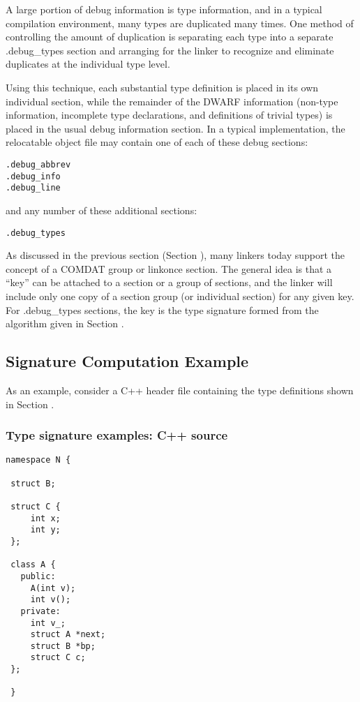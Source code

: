 A large portion of debug information is type information, and
in a typical compilation environment, many types are duplicated
many times. One method of controlling the amount of duplication
is separating each type into a separate .debug\_types section
and arranging for the linker to recognize and eliminate
duplicates at the individual type level.

Using this technique, each substantial type definition is
placed in its own individual section, while the remainder
of the DWARF information (non-type information, incomplete
type declarations, and definitions of trivial types) is
placed in the usual debug information section. In a typical
implementation, the relocatable object file may contain one
of each of these debug sections:

\begin{alltt}
.debug\_abbrev
.debug\_info
.debug\_line
\end{alltt}

and any number of these additional sections:

\begin{alltt}
.debug\_types
\end{alltt}

As discussed in the previous section 
(Section ), 
many
linkers today support the concept of a COMDAT group or
linkonce section. The general idea is that a ``key'' can be
attached to a section or a group of sections, and the linker
will include only one copy of a section group (or individual
section) for any given key. For .debug\_types sections, the
key is the type signature formed from the algorithm given in
Section .

\subsection{Signature Computation Example}
\label{app:signaturecomputationexample}

As an example, consider a C++ header file 
containing the type definitions shown
in Section .

\subsubsection{ Type signature examples: C++ source}
\label{app:typesignatureexamplescsource}
\begin{lstlisting}
namespace N {

 struct B;

 struct C {
     int x;
     int y;
 };

 class A {
   public:
     A(int v);
     int v();
   private:
     int v_;
     struct A *next;
     struct B *bp;
     struct C c;
 };

 }
\end{lstlisting}

